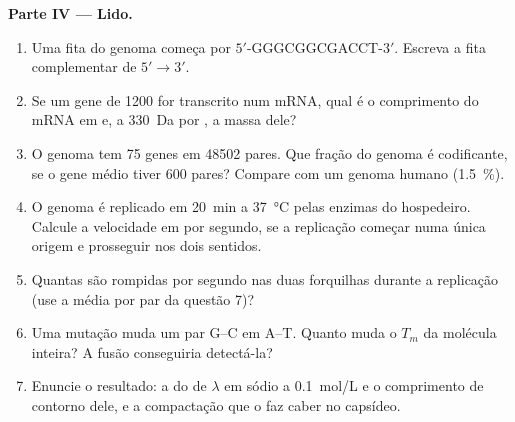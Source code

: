 \begin{problem}
\medskip
\noindent\textbf{Parte IV --- Lido.}
\begin{enumerate}[resume]
  \item Uma fita do genoma começa por $5'$-GGGCGGCGACCT-$3'$. Escreva a
        fita complementar de $5' \to 3'$.
  \item Se um gene de \num{1200}  for transcrito num mRNA,
        qual é o comprimento do mRNA em  e, a \qty{330}{Da}
        por , a massa dele?
  \item O genoma tem \qty{75}{} genes em \num{48502} pares. Que fração
        do genoma é codificante, se o gene médio tiver \num{600} pares?
        Compare com um genoma humano (\qty{1.5}{\%}).
  \item O genoma é replicado em \qty{20}{min} a \qty{37}{\celsius} pelas
        enzimas do hospedeiro. Calcule a velocidade em 
        por segundo, se a replicação começar numa única origem e
        prosseguir nos dois sentidos.
  \item Quantas  são rompidas por segundo nas duas
        forquilhas durante a replicação (use a média por par da
        questão 7)?
  \item Uma mutação muda um par G--C em A--T. Quanto muda o $T_m$ da
        molécula inteira? A fusão conseguiria detectá-la?
  \item Enuncie o resultado: a  do  de $\lambda$
        em sódio a \qty{0.1}{mol/L} e o comprimento de contorno dele, e
        a compactação que o faz caber no capsídeo.
\end{enumerate}
\end{problem}
